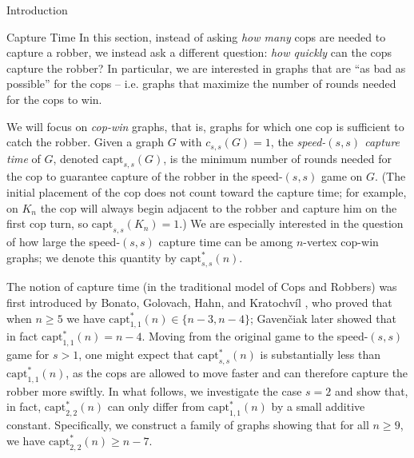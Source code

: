 \documentclass[12pt]{amsart}
\newcommand{\comment}[1]{\textcolor{red}{#1}}
\theoremstyle{definition}
\newcommand{\speed}[1]{c_{#1,#1}}
\newcommand{\capt}[1]{\mathrm{capt}_{#1,#1}}
\begin{document}
\begin{section}{Introduction}
\begin{section}{Capture Time}
In this section, instead of asking \textit{how many} cops are needed to capture a robber, we instead ask a different question: \textit{how quickly} can the cops capture the robber?   In particular, we are interested in graphs that are ``as bad as possible'' for the cops -- i.e. graphs that maximize the number of rounds needed for the cops to win.

We will focus on \textit{cop-win} graphs, that is, graphs for which one cop is sufficient to catch the robber.  Given a graph $G$ with $\speed{s}(G) = 1$, the \textit{speed-$(s,s)$ capture time} of $G$, denoted $\capt{s}(G)$, is the minimum number of rounds needed for the cop to guarantee capture of the robber in the speed-$(s,s)$ game on $G$.  (The initial placement of the cop does not count toward the capture time; for example, on $K_n$ the cop will always begin adjacent to the robber and capture him on the first cop turn, so $\capt{s}(K_n) = 1$.)  We are especially interested in the question of how large the speed-$(s,s)$ capture time can be among $n$-vertex cop-win graphs; we denote this quantity by $\capt{s}^*(n)$.

The notion of capture time (in the traditional model of Cops and Robbers) was first introduced by Bonato, Golovach, Hahn, and Kratochv\'{i}l \cite{BGHK09}, who proved that when $n \ge 5$ we have $\capt{1}^*(n)\in\{n-3,n-4\}$; Gaven\v{c}iak \cite{Gav10} later showed that in fact $\capt{1}^*(n)=n-4$.
Moving from the original game to the speed-$(s,s)$ game for $s>1$, one might expect that $\capt{s}^*(n)$ is substantially less than $\capt{1}^*(n)$, as the cops are allowed to move faster and can  therefore capture the robber more swiftly.  In what follows, we investigate the case $s=2$ and show that, in fact, $\capt{2}^*(n)$ can only differ from $\capt{1}^*(n)$ by a small additive constant.  Specifically, we construct a family of graphs showing that for all $n \ge 9$, we have $\capt{2}^*(n)\ge n-7$.  


\end{section}
\end{section}
\end{document}
